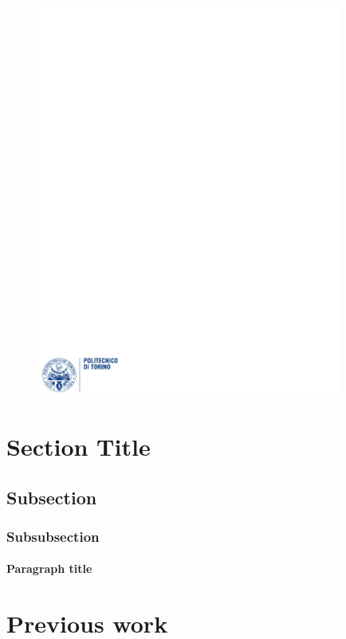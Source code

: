 \documentclass[12pt]{article}
\begin{document}
\begin{figure}
  \centering
  \includegraphics[width=10cm]{images/polito.pdf}
\end{figure}

\maketitle
\newpage
\tableofcontents
\newpage

\section{Section Title}\label{section1}
\subsection{Subsection}
\subsubsection{Subsubsection}
\paragraph{Paragraph title}

\section{Previous work}



\end{document}
